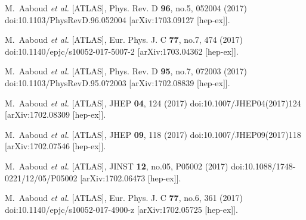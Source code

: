 \begin{thebibliography}{9}
M.~Aaboud \textit{et al.} [ATLAS],
Phys. Rev. D \textbf{96}, no.5, 052004 (2017)
doi:10.1103/PhysRevD.96.052004
[arXiv:1703.09127 [hep-ex]].

M.~Aaboud \textit{et al.} [ATLAS],
Eur. Phys. J. C \textbf{77}, no.7, 474 (2017)
doi:10.1140/epjc/s10052-017-5007-2
[arXiv:1703.04362 [hep-ex]].

M.~Aaboud \textit{et al.} [ATLAS],
Phys. Rev. D \textbf{95}, no.7, 072003 (2017)
doi:10.1103/PhysRevD.95.072003
[arXiv:1702.08839 [hep-ex]].

M.~Aaboud \textit{et al.} [ATLAS],
JHEP \textbf{04}, 124 (2017)
doi:10.1007/JHEP04(2017)124
[arXiv:1702.08309 [hep-ex]].

M.~Aaboud \textit{et al.} [ATLAS],
JHEP \textbf{09}, 118 (2017)
doi:10.1007/JHEP09(2017)118
[arXiv:1702.07546 [hep-ex]].

M.~Aaboud \textit{et al.} [ATLAS],
JINST \textbf{12}, no.05, P05002 (2017)
doi:10.1088/1748-0221/12/05/P05002
[arXiv:1702.06473 [hep-ex]].

M.~Aaboud \textit{et al.} [ATLAS],
Eur. Phys. J. C \textbf{77}, no.6, 361 (2017)
doi:10.1140/epjc/s10052-017-4900-z
[arXiv:1702.05725 [hep-ex]].


\end{thebibliography}
